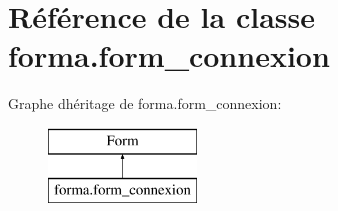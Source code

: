 \hypertarget{classforma_1_1form__connexion}{}\section{Référence de la classe forma.\+form\+\_\+connexion}
\label{classforma_1_1form__connexion}
Graphe d\textquotesingle{}héritage de forma.\+form\+\_\+connexion\+:\begin{figure}[H]
\begin{center}
\leavevmode
\includegraphics[height=2.000000cm]{classforma_1_1form__connexion}
\end{center}
\end{figure}
